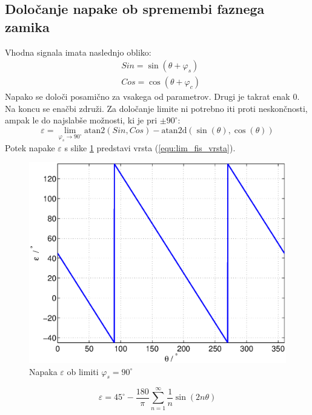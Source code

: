 \documentclass[a4paper]{article}
\begin{document}
\subsection{Določanje napake ob spremembi faznega zamika}


Vhodna signala imata naslednjo obliko:
\begin{eqnarray}
\label{equ:def_sin_fis}
&Sin = \sin(\theta + \varphi_{s})\\
\label{equ:def_cos_fis}
&Cos =\cos(\theta+\varphi_{c})
\end{eqnarray}
Napako se določi posamično za vsakega od parametrov. Drugi je takrat enak 0. Na koncu se enačbi združi. Za določanje limite ni potrebno iti proti neskončnosti, ampak le do najslabše možnosti, ki je pri $\pm 90^\circ$:
\begin{equation}
\label{equ:fis_lim}
\varepsilon = \lim_{\varphi_{s} \rightarrow 90^\circ} \mathrm{atan2}(Sin ,Cos)- \mathrm{atan2d}(\sin(\theta),\cos(\theta))
\end{equation}
Potek napake $\varepsilon$ s slike \ref{fig:lim_sin_fis} predstavi vrsta (\ref{equ:lim_fis_vrsta}).
\begin{figure}[!htb]
    \begin{center}
        \includegraphics[width=\linewidth]{./Slike/lim_sinfaza.eps}
        \caption{Napaka $\varepsilon$ ob limiti $\varphi_{s} = 90^\circ$} \label{fig:lim_sin_fis}
    \end{center}
\end{figure}
\begin{equation}
\label{equ:lim_fis_vrsta}
\varepsilon = 45^\circ - \frac{180}{\pi}\sum_{n=1}^{\infty}\frac{1}{n} \sin (2n \theta)
\end{equation} 
\end{document}
